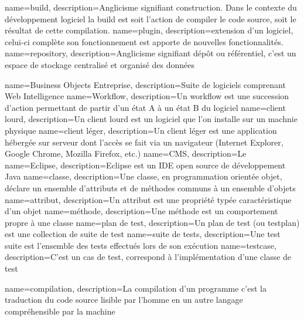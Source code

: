 

{
	name={build},
	description={Anglicisme signifiant construction. Dans le contexte du développement logiciel la build est soit l'action de compiler le code source, soit le résultat de cette compilation.}
}
{
	name={plugin},
	description={extension d'un logiciel, celui-ci complète son fonctionnement est apporte de nouvelles fonctionnalités.}
}
{
	name={repository},
	description={Anglicisme signifiant dépôt ou référentiel, c'est un espace de stockage centralisé et organisé des données}
}

{
	name={Business Objects Entreprise},
	description={Suite de logiciels comprenant Web Intelligence}
}
{
	name={Workflow},
	description={Un workflow est une succession d'action permettant de partir d'un état A à un état B du logiciel}
}
{
	name={client lourd},
	description={Un client lourd est un logiciel que l'on installe sur un machnie physique}
}
{
	name={client léger},
	description={Un client léger est une application hébergée sur serveur dont l'accès se fait via un navigateur (Internet Explorer, Google Chrome, Mozilla Firefox, etc.)}
}
{
	name={CMS},
	description={Le }
}
{
	name={Eclipse},
	description={Eclipse est un IDE open source de développement Java}
}
{
	name={classe},
	description={Une classe, en programmation orientée objet, déclare un ensemble d'attributs et de méthodes communs à un ensemble d'objets}
}
{
	name={attribut},
	description={Un attribut est une propriété typée caractéristique d'un objet}
}
{
	name={m\'{e}thode},
	description={Une méthode est un comportement propre à une classe}
}
{
	name={plan de test},
	description={Un plan de test (ou testplan) est une collection de suite de test}
}
{
	name={suite de tests},
	description={Une test suite est l'ensemble des tests effectués lors de son exécution}
}
{
	name={testcase},
	description={C'est un cas de test, correspond à l'implémentation d'une classe de test}
}

{
	name={compilation},
	description={La compilation d'un programme c'est la traduction du code source lisible par l'homme en un autre langage compréhensible par la machine}
}

